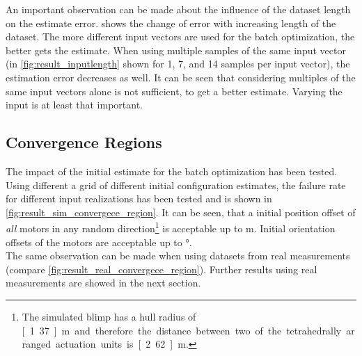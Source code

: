 An important observation can be made about the influence of the dataset length on the estimate error.
 shows the change of error with increasing length of the dataset.
The more different input vectors are used for the batch optimization, the better gets the estimate.
When using multiple samples of the same input vector (in \cref{fig:result_inputlength} shown for 1, 7, and 14 samples per input vector), the estimation error decreases as well.
It can be seen that considering multiples of the same input vectors alone is not sufficient, to get a better estimate.
Varying the input is at least that important.

\subsection{Convergence Regions}
The impact of the initial estimate for the batch optimization has been tested.
Using different a grid of different initial configuration estimates, the failure rate for different input realizations has been tested and is shown in \cref{fig:result_sim_convergece_region}.
It can be seen, that a initial position offset of \textit{all} motors in any random direction\footnote{
The simulated blimp has a hull radius of \unit[1.37]{m} and therefore the distance between two of the tetrahedrally arranged actuation units is \unit[2.62]{m}.}
is acceptable up to \unit[1]{m}.
Initial orientation offsets of the motors are acceptable up to \unit[120]{°}.
\\
The same observation can be made when using datasets from real measurements (compare \cref{fig:result_real_convergece_region}).
Further results using real measurements are showed in the next section.

